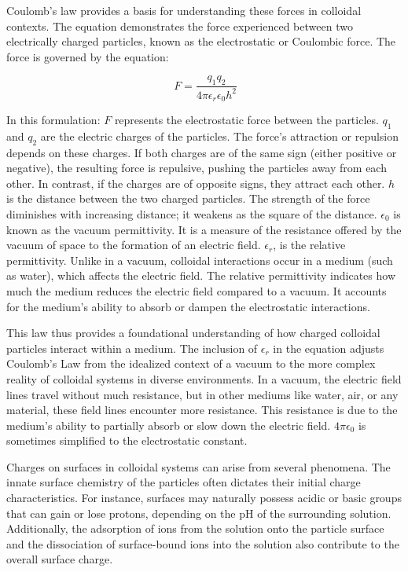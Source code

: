 Coulomb's law provides a basis for understanding these forces in colloidal contexts. The equation demonstrates the force experienced between two electrically charged particles, known as the electrostatic or Coulombic force. The force is governed by the
equation:

\begin{equation}
\
F = \frac{q_1q_2}{4 \pi \epsilon_r \epsilon_0 h^2}
\end{equation}

In this formulation:
$F$ represents the electrostatic force between the particles.
$q_1$ and $q_2$ are the electric charges of the particles. The force's attraction or repulsion depends on these charges. If both charges are of the same sign (either positive or negative), the resulting force is repulsive, pushing the particles away from each other. In contrast, if the charges are of opposite signs, they attract each other.
$h$ is the distance between the two charged particles. The strength of the force diminishes with increasing distance; it weakens as the square of the distance.
$\epsilon_0$ is known as the vacuum permittivity. It is a measure of the resistance offered by the vacuum of space to the formation of an electric field.
$\epsilon_r$, is the relative permittivity. Unlike in a vacuum, colloidal interactions occur in a medium (such as water), which affects the electric field. The relative permittivity indicates how much the medium reduces the electric field compared to a vacuum. It accounts for the medium's ability to absorb or dampen the electrostatic interactions.

This law thus provides a foundational understanding of how charged colloidal particles interact within a medium. The inclusion of $\epsilon_r$ in the equation adjusts Coulomb's Law from the idealized context of a vacuum to the more complex reality of colloidal systems in diverse environments. In a vacuum, the electric field lines travel without much resistance, but in other mediums like water, air, or any material, these field lines encounter more resistance. This resistance is due to the medium's ability to partially absorb or slow down the electric field. $4\pi \epsilon_0$ is sometimes simplified to the electrostatic constant. 

Charges on surfaces in colloidal systems can arise from several phenomena. The innate surface chemistry of the particles often dictates their initial charge characteristics. For instance, surfaces may naturally possess acidic or basic groups that can gain or lose protons, depending on the pH of the surrounding solution. Additionally, the adsorption of ions from the solution onto the particle surface and the dissociation of surface-bound ions into the solution also contribute to the overall surface charge.

